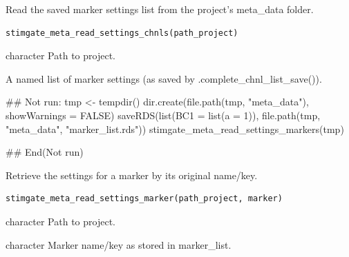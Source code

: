 \documentclass[letterpaper]{book}
\begin{document}
%
\begin{Description}
Read the saved marker settings list from the project's meta\_data folder.
\end{Description}
%
\begin{Usage}
\begin{verbatim}
stimgate_meta_read_settings_chnls(path_project)
\end{verbatim}
\end{Usage}
%
\begin{Arguments}
\begin{ldescription}
\item[\code{path\_project}] character Path to project.
\end{ldescription}
\end{Arguments}
%
\begin{Value}
A named list of marker settings (as saved by .complete\_chnl\_list\_save()).
\end{Value}
%
\begin{Examples}
\begin{ExampleCode}
## Not run: 
tmp <- tempdir()
dir.create(file.path(tmp, "meta_data"), showWarnings = FALSE)
saveRDS(list(BC1 = list(a = 1)), file.path(tmp, "meta_data", "marker_list.rds"))
stimgate_meta_read_settings_markers(tmp)

## End(Not run)
\end{ExampleCode}
\end{Examples}
%
\begin{Description}
Retrieve the settings for a marker by its original name/key.
\end{Description}
%
\begin{Usage}
\begin{verbatim}
stimgate_meta_read_settings_marker(path_project, marker)
\end{verbatim}
\end{Usage}
%
\begin{Arguments}
\begin{ldescription}
\item[\code{path\_project}] character Path to project.

\item[\code{marker}] character Marker name/key as stored in marker\_list.
\end{ldescription}
\end{Arguments}
\end{document}

